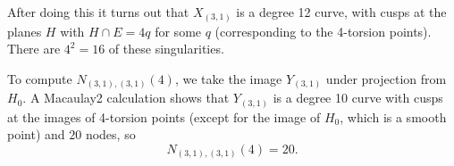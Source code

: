 \documentclass[thesis]{thesis-umich}           %
\theoremstyle{definition}
\begin{document}
After doing this it turns out that $X_{(3,1)}$ is a degree 12 curve, with cusps at the planes $H$ with $H\cap E=4q$ for some $q$ (corresponding to the 4-torsion points). There are $4^2=16$ of these singularities.

To compute $N_{(3,1),(3,1)}(4)$, we take the image $Y_{(3,1)}$ under projection from $H_0$. A Macaulay2 calculation shows that $Y_{(3,1)}$ is a degree 10
curve with cusps at the images of 4-torsion points (except for the image of $H_0$, which is a smooth point) and $20$ nodes, so
\[
N_{(3,1),(3,1)}(4)=20.
\]







\end{document}
